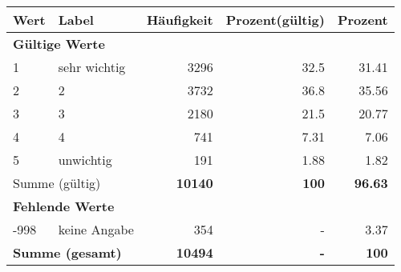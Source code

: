      \begin{longtable}{lXrrr}
     \toprule
     \textbf{Wert} & \textbf{Label} & \textbf{Häufigkeit} & \textbf{Prozent(gültig)} & \textbf{Prozent} \\
     \endhead
     \midrule
     \multicolumn{5}{l}{\textbf{Gültige Werte}}\\

     1 &
     \multicolumn{1}{X}{ sehr wichtig   } &


       \num{3296} &
       \num[round-mode=places,round-precision=2]{32.5} &
         \num[round-mode=places,round-precision=2]{31.41} \\

     2 &
     \multicolumn{1}{X}{ 2   } &


       \num{3732} &
       \num[round-mode=places,round-precision=2]{36.8} &
         \num[round-mode=places,round-precision=2]{35.56} \\

     3 &
     \multicolumn{1}{X}{ 3   } &


       \num{2180} &
       \num[round-mode=places,round-precision=2]{21.5} &
         \num[round-mode=places,round-precision=2]{20.77} \\

     4 &
     \multicolumn{1}{X}{ 4   } &


       \num{741} &
       \num[round-mode=places,round-precision=2]{7.31} &
         \num[round-mode=places,round-precision=2]{7.06} \\

     5 &
     \multicolumn{1}{X}{ unwichtig   } &


       \num{191} &
       \num[round-mode=places,round-precision=2]{1.88} &
         \num[round-mode=places,round-precision=2]{1.82} \\
     \midrule
     \multicolumn{2}{l}{Summe (gültig)} &
       \textbf{\num{10140}} &
     \textbf{\num{100}} &
       \textbf{\num[round-mode=places,round-precision=2]{96.63}} \\
     \multicolumn{5}{l}{\textbf{Fehlende Werte}}\\
       -998 &
       keine Angabe &
         \num{354} &
        - &
         \num[round-mode=places,round-precision=2]{3.37} \\
     \midrule
     \multicolumn{2}{l}{\textbf{Summe (gesamt)}} &
          \textbf{\num{10494}} &
        \textbf{-} &
        \textbf{\num{100}} \\
     \bottomrule
     \end{longtable}
     
